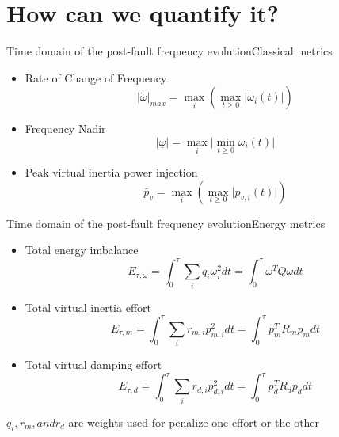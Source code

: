 \documentclass[aspectratio=169, 12pt]{beamer}
\begin{document}
  \section{How can we quantify it?}

  \begin{frame}{Time domain of the post-fault frequency evolution}{Classical metrics}
    \begin{itemize}[<+(1)->]
      \item Rate of Change of Frequency
      \begin{equation}
        \lvert \dot{\omega} \rvert _{max} = \max_i\left(\max_{t\ge0}\lvert \dot{\omega}_i(t) \rvert\right)
      \end{equation}
      
      \item Frequency Nadir
      \begin{equation}
        \lvert \underline{\omega} \rvert = \max_i\lvert\min_{t\ge0} \omega_i(t) \rvert
      \end{equation}
      \item Peak virtual inertia power injection
      \begin{equation}
        \bar{p}_v = \max_i\left(\max_{t\ge0}\lvert p_{v,i}(t) \rvert\right)
      \end{equation}
    \end{itemize}
  \end{frame}

  \begin{frame}{Time domain of the post-fault frequency evolution}{Energy metrics}
    
    \begin{itemize}[<+(1)->]
        \item Total energy imbalance
        \begin{equation}
          E_{\tau,\omega}=\int_{0}^{\tau}\sum_{i} q_i\omega_i^{2}dt=\int_{0}^{\tau} \omega^T Q \omega dt
        \end{equation}
        
        \item Total virtual inertia effort
        \begin{equation}
          E_{\tau,m}=\int_{0}^{\tau}\sum_{i} r_{m,i}p_{m,i}^{2}dt=\int_{0}^{\tau} p_{m}^T R_m p_{m} dt
        \end{equation}

        \item Total virtual damping effort
        \begin{equation}
          E_{\tau,d}=\int_{0}^{\tau}\sum_{i} r_{d,i}p_{d,i}^{2}dt=\int_{0}^{\tau} p_{d}^T R_d p_{d} dt
        \end{equation}
      \end{itemize}

      $q_i, r_m, and r_d$ are weights used for penalize one effort or the other
  \end{frame}
  
\end{document}
